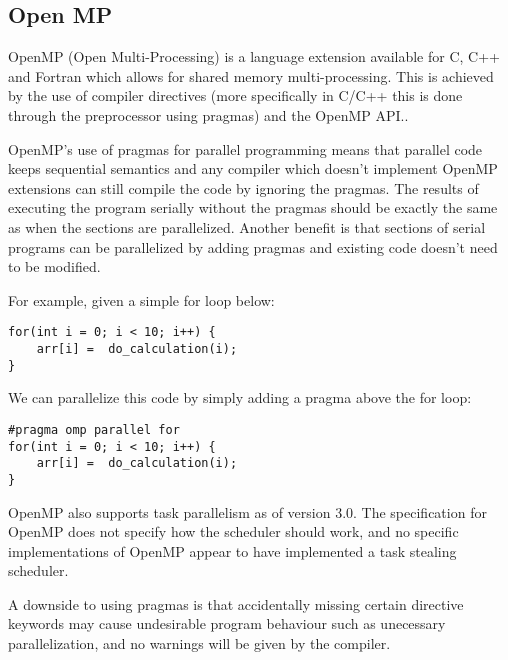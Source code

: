 \subsection{Open MP}

OpenMP (Open Multi-Processing) is a language extension available for C, C++ and Fortran which allows for shared memory multi-processing. 
This is achieved by the use of compiler directives (more specifically in C/C++ this is done through the preprocessor using pragmas) and
the OpenMP API.\cite{openmp}.

OpenMP's use of pragmas for parallel programming means that parallel code keeps sequential semantics
and any compiler which doesn't implement OpenMP extensions can still compile the code by ignoring the pragmas.
The results of executing the program serially without the pragmas should be exactly the same as when
the sections are parallelized. Another benefit is that sections of serial programs can be
parallelized by adding pragmas and existing code doesn't need to be modified.

For example, given a simple for loop below:

\begin{lstlisting}[style=myGPC]
for(int i = 0; i < 10; i++) {
    arr[i] =  do_calculation(i);
}
\end{lstlisting}

We can parallelize this code by simply adding a pragma above
the for loop:

\begin{lstlisting}[style=myGPC] 
#pragma omp parallel for
for(int i = 0; i < 10; i++) {
    arr[i] =  do_calculation(i);
}
\end{lstlisting}

OpenMP also supports task parallelism as of version 3.0\cite{openmp3}. The specification for OpenMP
does not specify how the scheduler should work, and no specific implementations of OpenMP appear to have 
implemented a task stealing scheduler.

A downside to using pragmas is that accidentally missing certain directive keywords may cause undesirable 
program behaviour such as unecessary parallelization\cite{openmptraps}, and no warnings will be given by the compiler.

 
